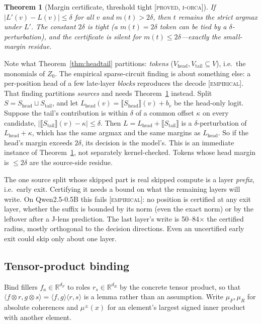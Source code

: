 \documentclass[11pt]{article}
\theoremstyle{definition}
\theoremstyle{plain}
\newtheorem{theorem}{Theorem}[section]
\theoremstyle{remark}
\newcommand{\proved}{\textsc{[proved, i-orca]}}
\newcommand{\empirical}{\textsc{[empirical]}}
\newcommand{\RR}{\mathbb{R}}
\newcommand{\Vh}{V_{\mathrm{head}}}
\newcommand{\Vt}{V_{\mathrm{tail}}}
\newcommand{\Sh}{S_{\mathrm{head}}}
\newcommand{\St}{S_{\mathrm{tail}}}
\begin{document}
\begin{theorem}[Margin certificate, threshold tight \proved{}]\label{thm:margin}
If $|L'(v)-L(v)|\le\delta$ for all $v$ and $m(t)>2\delta$, then $t$ remains the strict argmax under $L'$.
The constant $2\delta$ is tight (a $m(t)=2\delta$ token can be tied by a $\delta$-perturbation), and the
certificate is silent for $m(t)\le2\delta$---exactly the small-margin residue.
\end{theorem}

\noindent Note what Theorem~\ref{thm:headtail} partitions: \emph{tokens} ($\Vh,\Vt\subseteq V$), i.e.\ the
monomials of $Z_0$. The empirical sparse-circuit finding is about something else: a per-position head of
a few late-layer \emph{blocks} reproduces the decode \empirical{}. That finding partitions \emph{sources}
and needs Theorem~\ref{thm:margin} instead. Split $S=\Sh\sqcup\St$, and let
$L_{\mathrm{head}}(v)=\llbracket\Sh\rrbracket(v)+b_v$ be the head-only logit. Suppose the tail's contribution
is within $\delta$ of a common offset $\kappa$ on every candidate, $|\llbracket\St\rrbracket(v)-\kappa|\le\delta$.
Then $L=L_{\mathrm{head}}+\llbracket\St\rrbracket$ is a $\delta$-perturbation of $L_{\mathrm{head}}+\kappa$,
which has the same argmax and the same margins as $L_{\mathrm{head}}$. So if the head's margin exceeds $2\delta$, its decision is the model's.
This is an immediate instance of Theorem~\ref{thm:margin}, not separately kernel-checked. Tokens whose head
margin is $\le2\delta$ are the source-side residue.

The one source split whose skipped part is real skipped compute is a layer \emph{prefix}, i.e.\ early exit.
Certifying it needs a bound on what the remaining layers will write. On Qwen2.5-0.5B this fails \empirical{}:
no position is certified at any exit layer, whether the suffix is bounded by its norm (even the exact norm) or by
the leftover after a J-lens prediction. The last layer's write is 50--84$\times$ the certified radius, mostly
orthogonal to the decision directions. Even an uncertified early exit could skip only about one layer.

\subsection{Tensor-product binding}\label{sec:binding}

Bind fillers $f_a\in\RR^{d_F}$ to roles $r_s\in\RR^{d_R}$ by the concrete tensor product, so that
$\langle f\otimes r,g\otimes s\rangle=\langle f,g\rangle\langle r,s\rangle$ is a lemma rather than an assumption.
Write $\mu_F,\mu_R$ for absolute coherences and $\mu^{\pm}(x)$ for an element's largest signed inner product with
another element.
\end{document}
